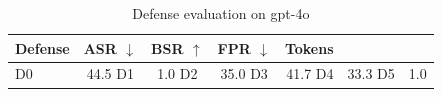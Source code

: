 \begin{table}[t]
\centering
\small
\begin{tabular}{l c c c r}
\toprule
Defense & ASR $\downarrow$ & BSR $\uparrow$ & FPR $\downarrow$ & Tokens \\
\midrule
D0 & 44.5%
D1 & 1.0%
D2 & 35.0%
D3 & 41.7%
D4 & 33.3%
D5 & 1.0%
\bottomrule
\end{tabular}
\caption{Defense evaluation on gpt-4o}
\label{tab:results_gpt_4o}
\end{table}